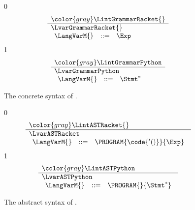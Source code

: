 \documentclass[7x10]{TimesAPriori_MIT}%
\newcommand{\gray}[1]{{\color{gray} #1}}
\def\racketEd{0}
\def\pythonEd{1}
\def\edition{1}
\newcommand{\pythonColor}[0]{}
\numberwithin{theorem}{chapter}
\numberwithin{definition}{chapter}
\numberwithin{equation}{chapter}
\begin{document}
\begin{figure}[tp]
\centering
\begin{tcolorbox}[colback=white]
{\if\edition\racketEd
\[
\begin{array}{l}
   \gray{\LintGrammarRacket{}} \\ \hline
   \LvarGrammarRacket{}  \\
  \begin{array}{rcl}
    \LangVarM{} &::=& \Exp
  \end{array}
\end{array}
\]
\fi}
{\if\edition\pythonEd\pythonColor
\[
\begin{array}{l}
  \gray{\LintGrammarPython} \\ \hline
  \LvarGrammarPython \\
\begin{array}{rcl}
  \LangVarM{} &::=& \Stmt^{*}
\end{array}
\end{array}
\]
\fi}
\end{tcolorbox}
\caption{The concrete syntax of \LangVar{}.}
\label{fig:Lvar-concrete-syntax}
\end{figure}

\begin{figure}[tp]
\centering
\begin{tcolorbox}[colback=white]
{\if\edition\racketEd
\[
\begin{array}{l}
  \gray{\LintASTRacket{}} \\ \hline
  \LvarASTRacket \\
  \begin{array}{rcl}
    \LangVarM{} &::=& \PROGRAM{\code{'()}}{\Exp}
  \end{array}
\end{array}
\]
\fi}
{\if\edition\pythonEd\pythonColor
  \[
  \begin{array}{l}
  \gray{\LintASTPython}\\ \hline
  \LvarASTPython \\
\begin{array}{rcl}
\LangVarM{}  &::=& \PROGRAM{}{\Stmt^{*}}
\end{array}
\end{array}
\]
\fi}
\end{tcolorbox}
\caption{The abstract syntax of \LangVar{}.}
\label{fig:Lvar-syntax}
\end{figure}
\end{document}
